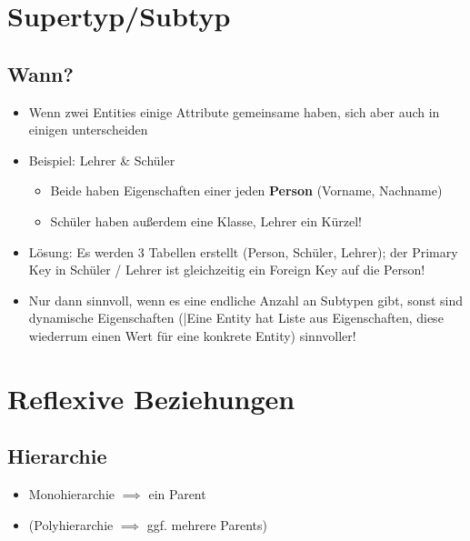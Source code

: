 \section{Supertyp/Subtyp}
\subsection{Wann?}
\begin{itemize}
    \item Wenn zwei Entities einige Attribute gemeinsame haben, sich aber auch in einigen unterscheiden
    \item Beispiel: Lehrer \& Schüler
    \begin{itemize}
        \item Beide haben Eigenschaften einer jeden \textbf{Person} (Vorname, Nachname)
        \item Schüler haben außerdem eine Klasse, Lehrer ein Kürzel!
    \end{itemize}
    \item Lösung: Es werden 3 Tabellen erstellt (Person, Schüler, Lehrer); der Primary Key in Schüler / Lehrer ist gleichzeitig ein Foreign Key auf die Person!
    \item Nur dann sinnvoll, wenn es eine endliche Anzahl an Subtypen gibt, sonst sind dynamische Eigenschaften (|Eine Entity hat Liste aus Eigenschaften, diese wiederrum einen Wert für eine konkrete Entity) sinnvoller!
\end{itemize}

\section{Reflexive Beziehungen}
\subsection{Hierarchie}
\begin{itemize}
    \item Monohierarchie $\implies$ ein Parent
    \item (Polyhierarchie $\implies$ ggf. mehrere Parents)
\end{itemize}
